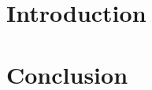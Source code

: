 \documentclass[
    comatec, %
    rocm, %
]{heig-tb}
\begin{document}
\maketitle
\frontmatter
\clearemptydoublepage

\preamble
\authentification

\begin{abstract}
    
\end{abstract}

\clearemptydoublepage
{
    \tableofcontents
    \let\cleardoublepage\clearpage
    \listoffigures
    \let\cleardoublepage\clearpage
    \listoftables
    \let\cleardoublepage\clearpage
    \listoflistings
}

\printnomenclature
\clearemptydoublepage
{}

\mainmatter
\chapter{Introduction}



\chapter{Conclusion}


\clearpage
\printbibliography

\appendix
\appendixpage
\addappheadtotoc



\let\cleardoublepage\clearpage
\backmatter

\label{glossaire}
\printnoidxglossary
\label{index}
\printindex


\end{document}
